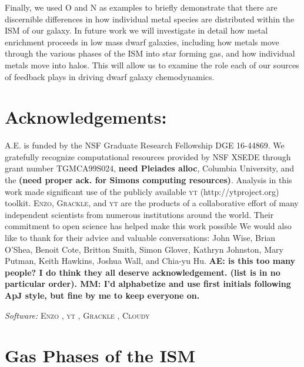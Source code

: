 \documentclass[twocolumn]{aastex61}
\begin{document}
Finally, we used O and N as examples to briefly demonstrate that there are discernible differences in how individual metal species are distributed within the ISM of our galaxy. In future work we will investigate in detail how metal enrichment proceeds in low mass dwarf galaxies, including how metals move through the various phases of the ISM into star forming gas, and how individual metals move 
  into halos. 
   This will allow us to examine
the role each of our sources of feedback plays in driving dwarf galaxy chemodynamics.

\section*{Acknowledgements:} A.E. is funded by the NSF Graduate Research Fellowship DGE 16-44869. 
We gratefully recognize computational
resources provided by NSF XSEDE through grant number TGMCA99S024, \textbf{need Pleiades alloc}, Columbia University, and the \textbf{(need proper ack. for Simons computing resources)}. Analysis in this work
made significant use of the publicly available \textsc{yt} (http://ytproject.org)
toolkit. \textsc{Enzo}, \textsc{Grackle}, and \textsc{yt} are the products of a collaborative effort of many independent scientists from numerous institutions around
the world. Their commitment to open science has helped make
this work possible
We would also like to thank for their advice and valuable conversations: John Wise, Brian O'Shea, Benoit Cote, Britton Smith, Simon Glover, Kathryn Johnston, Mary Putman, Keith Hawkins, Joshua Wall, and Chia-yu Hu. \textbf{AE: is this too many people? I do think they all deserve acknowledgement. (list is in no particular order).  MM: I'd alphabetize and use first initials following ApJ style, but fine by me to keep everyone on.}

\textit{Software:} \textsc{Enzo} \citep{Enzo2014}, \textsc{yt} \citep{yt}, \textsc{Grackle} \citep{GrackleMethod}, \textsc{Cloudy} \citep{Cloudy2013}
%
%




\appendix
\renewcommand\thefigure{\thesection.\arabic{figure}}    
\setcounter{figure}{0}

\section{Gas Phases of the ISM}
\label{appendix:phases}
\end{document}
